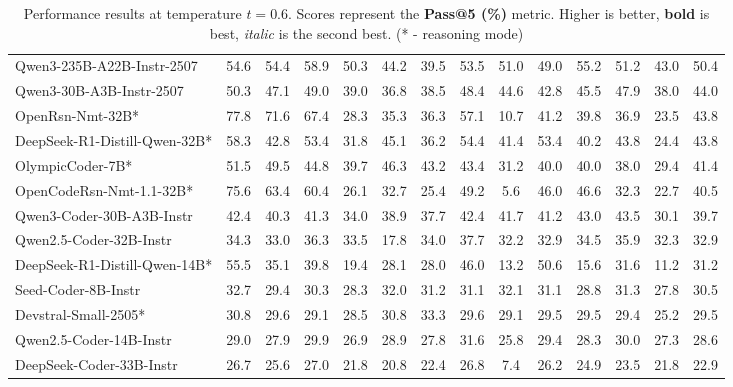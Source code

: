 \documentclass{llmxive}
\begin{document}
\begin{table}[hbt]
{\begin{tabular}{l *{13}{c}}
Qwen3-235B-A22B-Instr-2507 &	54.6&	54.4&	58.9&	50.3&	44.2&	39.5&	53.5&	51.0&	49.0&	55.2&	51.2&	43.0&	50.4\\															
Qwen3-30B-A3B-Instr-2507 &	50.3&	47.1&	49.0&	39.0&	36.8&	38.5&	48.4&	44.6&	42.8&	45.5&	47.9&	38.0&	44.0\\											
\rowcolor{gray!10}
OpenRsn-Nmt-32B* &	77.8&	71.6&	67.4&	28.3&	35.3&	36.3&	57.1&	10.7&	41.2&	39.8&	36.9&	23.5&	43.8\\														
DeepSeek-R1-Distill-Qwen-32B* &	58.3&	42.8&	53.4&	31.8&	45.1&	36.2&	54.4&	41.4&	53.4&	40.2&	43.8&	24.4&	43.8\\											
\rowcolor{gray!10}
OlympicCoder-7B* & 51.5&	49.5&	44.8&	39.7&	46.3&	43.2&	43.4&	31.2&	40.0&	40.0&	38.0&	29.4&	41.4\\														
OpenCodeRsn-Nmt-1.1-32B*&	75.6&	63.4&	60.4&	26.1&	32.7&	25.4&	49.2&	5.6&	46.0&	46.6&	32.3&	22.7&	40.5\\												
\rowcolor{gray!10}
Qwen3-Coder-30B-A3B-Instr&	42.4&	40.3&	41.3&	34.0&	38.9&	37.7&	42.4&	41.7&	41.2&	43.0&	43.5&	30.1&	39.7\\														
Qwen2.5-Coder-32B-Instr&	34.3&	33.0&	36.3&	33.5&	17.8&	34.0&	37.7&	32.2&	32.9&	34.5&	35.9&	32.3&	32.9\\								
\rowcolor{gray!10}
DeepSeek-R1-Distill-Qwen-14B*&	55.5&	35.1&	39.8&	19.4&	28.1&	28.0&	46.0&	13.2&	50.6&	15.6&	31.6&	11.2&	31.2\\													
Seed-Coder-8B-Instr&	32.7&	29.4&	30.3&	28.3&	32.0&	31.2&	31.1&	32.1&	31.1&	28.8&	31.3&	27.8&	30.5\\									
\rowcolor{gray!10}
Devstral-Small-2505* &	30.8&	29.6&	29.1&	28.5&	30.8&	33.3&	29.6&	29.1&	29.5&	29.5&	29.4&	25.2&	29.5\\												
Qwen2.5-Coder-14B-Instr&	29.0&	27.9&	29.9&	26.9&	28.9&	27.8&	31.6&	25.8&	29.4&	28.3&	30.0&	27.3&	28.6\\							
\rowcolor{gray!10}
DeepSeek-Coder-33B-Instr&	26.7&	25.6&	27.0&	21.8&	20.8&	22.4&	26.8&	7.4&	26.2&	24.9&	23.5&	21.8&	22.9\\														
													
\bottomrule
\end{tabular}%
}
\caption{Performance results at temperature $t=0.6$. Scores represent the \textbf{Pass@5 (\%)} metric. Higher is better, \textbf{bold} is best, \textit{italic} is the second best. (* - reasoning mode)}
\label{tab_exps_feb25_pass5_t0.6}
\end{table}
\end{document}
